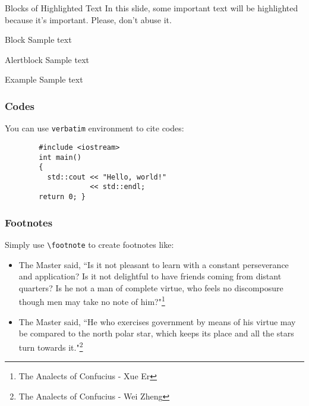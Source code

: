 \documentclass[aspectratio=169,xcolor=dvipsnames, t]{beamer}
\begin{document}
\begin{frame}{Blocks of Highlighted Text}
    In this slide, some important text will be \alert{highlighted} because it's important. Please, don't abuse it.

    \begin{block}{Block}
        Sample text
    \end{block}

    \begin{alertblock}{Alertblock}
        Sample text
    \end{alertblock}

    \begin{exampleblock}{Example}
        Sample text
    \end{exampleblock}
\end{frame}

\begin{frame}[fragile]%
    \frametitle{Codes}
    You can use \verb|verbatim| environment to cite codes:
    \begin{verbatim}
        #include <iostream>
        int main()
        {
          std::cout << "Hello, world!"
                    << std::endl;
        return 0; }
    \end{verbatim}
\end{frame}
\begin{frame}[fragile]
    \frametitle{Footnotes}
    Simply use \verb|\footnote| to create footnotes like:
    \begin{itemize}
        \item The Master said, ``Is it not pleasant to learn with a constant perseverance and application? Is it not delightful to have friends coming from distant quarters? Is he not a man of complete virtue, who feels no discomposure though men may take no note of him?"\footnote{The Analects of Confucius - Xue Er}
        \item The Master said, ``He who exercises government by means of his virtue may be compared to the north polar star, which keeps its place and all the stars turn towards it."\footnote{The Analects of Confucius - Wei Zheng}
    \end{itemize}
\end{frame}
\end{document}
